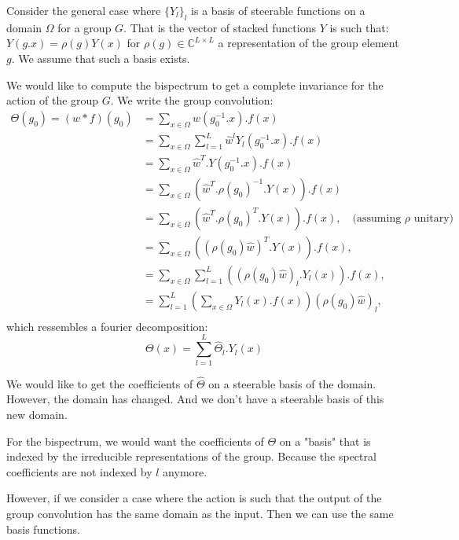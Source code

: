 \documentclass{article}
\begin{document}
Consider the general case where $\{Y_l\}_l$ is a basis of steerable functions on a domain $\mathbb{\Omega}$ for a group $G$. That is the vector of stacked functions $Y$ is such that: $Y(g.x) = \rho(g)Y(x)$ for $\rho(g) \in \mathbb{C}^{L \times L}$ a representation of the group element $g$. We assume that such a basis exists.

We would like to compute the bispectrum to get a complete invariance for the action of the group $G$. We write the group convolution:
\begin{align*}
    \Theta(g_0) = (w \ast f)(g_0)
    &= \sum_{x \in \Omega}
        w(g_0^{-1}.x).f(x) \\
    &= \sum_{x \in \Omega}
        \sum_{l=1}^L \hat{w}^{l}Y_l(g_0^{-1}.x).f(x) \\
    &= \sum_{x \in \Omega}
        \hat{w}^T.Y(g_0^{-1}.x).f(x) \\
    &= \sum_{x \in \Omega}
        \left(\hat{w}^T.\rho(g_0)^{-1}.Y(x)\right).f(x) \\
    &= \sum_{x \in \Omega}
        \left(\hat{w}^T.\rho(g_0)^T.Y(x)\right).f(x),\quad \text{(assuming $\rho$ unitary)} \\
    &= \sum_{x \in \Omega}
        \left((\rho(g_0)\hat{w})^T.Y(x)\right).f(x),\\
    &= \sum_{x \in \Omega} \sum_{l=1}^L
        \left((\rho(g_0)\hat{w})_l.Y_l(x)\right).f(x),\\
    &=  \sum_{l=1}^L \left(
    \sum_{x \in \Omega}
        Y_l(x).f(x) \right)(\rho(g_0)\hat{w})_l,\\
\end{align*}
which ressembles a fourier decomposition:
\begin{equation}
    \Theta(x) = \sum_{l=1}^L \hat \Theta_l . Y_l(x)
\end{equation}

We would like to get the coefficients of $\hat{\Theta}$ on a steerable basis of the domain. However, the domain has changed. And we don't have a steerable basis of this new domain.

For the bispectrum, we would want the coefficients of $\Theta$ on a "basis" that is indexed by the irreducible representations of the group. Because the spectral coefficients are not indexed by $l$ anymore.

However, if we consider a case where the action is such that the output of the group convolution has the same domain as the input. Then we can use the same basis functions.
\end{document}
